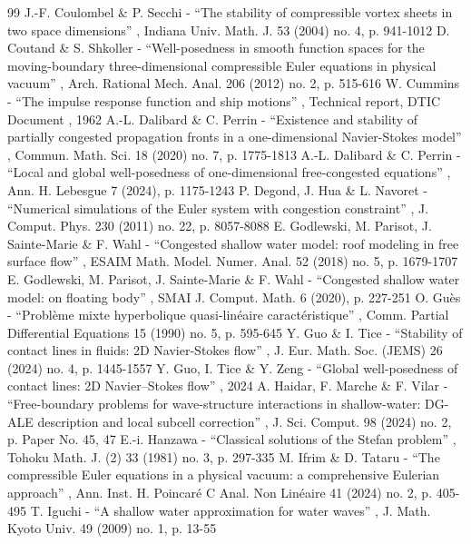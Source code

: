 \documentclass[11pt]{article}
\theoremstyle{definition}
\begin{document}
\begin{thebibliography}{99}
 J.-F. Coulombel \& P. Secchi - “The stability of compressible vortex sheets in two space dimensions” , Indiana Univ. Math. J. 53 (2004) no. 4, p. 941-1012
 D. Coutand \& S. Shkoller - “Well-posedness in smooth function spaces for the moving-boundary three-dimensional compressible Euler equations in physical vacuum” , Arch. Rational Mech. Anal. 206 (2012) no. 2, p. 515-616
 W. Cummins - “The impulse response function and ship motions” , Technical report, DTIC Document , 1962
 A.-L. Dalibard \& C. Perrin - “Existence and stability of partially congested propagation fronts in a one-dimensional Navier-Stokes model” , Commun. Math. Sci. 18 (2020) no. 7, p. 1775-1813
 A.-L. Dalibard \& C. Perrin - “Local and global well-posedness of one-dimensional free-congested equations” , Ann. H. Lebesgue 7 (2024), p. 1175-1243
 P. Degond, J. Hua \& L. Navoret - “Numerical simulations of the Euler system with congestion constraint” , J. Comput. Phys. 230 (2011) no. 22, p. 8057-8088
 E. Godlewski, M. Parisot, J. Sainte-Marie \& F. Wahl - “Congested shallow water model: roof modeling in free surface flow” , ESAIM Math. Model. Numer. Anal. 52 (2018) no. 5, p. 1679-1707
 E. Godlewski, M. Parisot, J. Sainte-Marie \& F. Wahl - “Congested shallow water model: on floating body” , SMAI J. Comput. Math. 6 (2020), p. 227-251
 O. Guès - “Problème mixte hyperbolique quasi-linéaire caractéristique” , Comm. Partial Differential Equations 15 (1990) no. 5, p. 595-645
 Y. Guo \& I. Tice - “Stability of contact lines in fluids: 2D Navier-Stokes flow” , J. Eur. Math. Soc. (JEMS) 26 (2024) no. 4, p. 1445-1557
 Y. Guo, I. Tice \& Y. Zeng - “Global well-posedness of contact lines: 2D Navier–Stokes flow” , 2024
 A. Haidar, F. Marche \& F. Vilar - “Free-boundary problems for wave-structure interactions in shallow-water: DG-ALE description and local subcell correction” , J. Sci. Comput. 98 (2024) no. 2, p. Paper No. 45, 47
 E.-i. Hanzawa - “Classical solutions of the Stefan problem” , Tohoku Math. J. (2) 33 (1981) no. 3, p. 297-335
 M. Ifrim \& D. Tataru - “The compressible Euler equations in a physical vacuum: a comprehensive Eulerian approach” , Ann. Inst. H. Poincaré C Anal. Non Linéaire 41 (2024) no. 2, p. 405-495
 T. Iguchi - “A shallow water approximation for water waves” , J. Math. Kyoto Univ. 49 (2009) no. 1, p. 13-55

\end{thebibliography}
\end{document}
